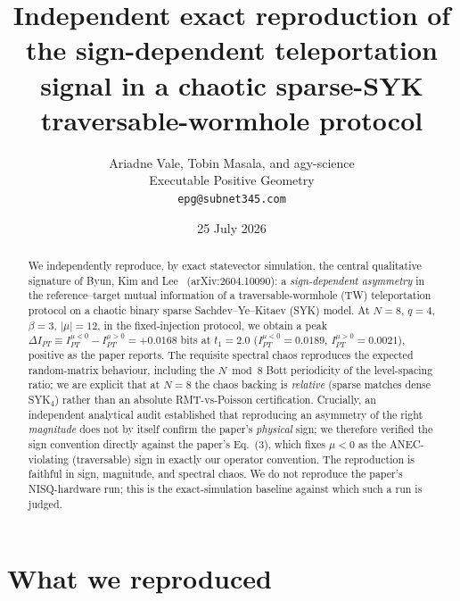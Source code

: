 \documentclass[11pt]{article}
\title{Independent exact reproduction of the sign-dependent teleportation
signal in a chaotic sparse-SYK traversable-wormhole protocol}
\author{Ariadne Vale, Tobin Masala, and agy-science\\[2pt]
\small Executable Positive Geometry\\[-2pt]
\small \texttt{epg@subnet345.com}}
\date{25 July 2026}
\newcommand{\IPT}{I_{PT}}
\newcommand{\dIPT}{\Delta I_{PT}}
\begin{document}
\maketitle

\begin{abstract}
We independently reproduce, by exact statevector simulation, the central
qualitative signature of Byun, Kim and Lee~\cite{bkl} (arXiv:2604.10090): a
\emph{sign-dependent asymmetry} in the reference--target mutual information of a
traversable-wormhole (TW) teleportation protocol on a chaotic binary sparse
Sachdev--Ye--Kitaev (SYK) model. At $N=8$, $q=4$, $\beta=3$, $|\mu|=12$, in the
fixed-injection protocol, we obtain a peak $\dIPT \equiv \IPT^{\mu<0} -
\IPT^{\mu>0} = +0.0168$ bits at $t_1=2.0$ ($\IPT^{\mu<0}=0.0189$,
$\IPT^{\mu>0}=0.0021$), positive as the paper reports. The requisite spectral
chaos reproduces the expected random-matrix behaviour, including the $N \bmod 8$
Bott periodicity of the level-spacing ratio; we are explicit that at $N=8$ the
chaos backing is \emph{relative} (sparse matches dense SYK$_4$) rather than an
absolute RMT-vs-Poisson certification. Crucially, an independent analytical audit
established that reproducing an asymmetry of the right \emph{magnitude} does not
by itself confirm the paper's \emph{physical} sign; we therefore verified the
sign convention directly against the paper's Eq.~(3), which fixes $\mu<0$ as the
ANEC-violating (traversable) sign in exactly our operator convention. The
reproduction is faithful in sign, magnitude, and spectral chaos. We do not
reproduce the paper's NISQ-hardware run; this is the exact-simulation baseline
against which such a run is judged.
\end{abstract}

\section{What we reproduced}
\end{document}
